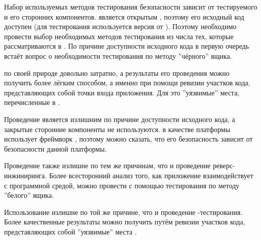 %
Набор используемых методов тестирования безопасности  зависит от  тестируемого  и его сторонних компонентов.
%
 является открытым , поэтому его исходный код доступен  (для тестирования используется версия  от ). 
%
Поэтому необходимо провести выбор необходимых методов тестирования из числа тех, которые рассматриваются в .
%
По причине доступности исходного кода в первую очередь встаёт вопрос о необходимости тестирования по методу ''чёрного'' ящика. 



%
 по своей природе довольно затратно, а результаты его проведения можно получить более лёгким способом, а именно при помощи ревизии участков кода, представляющих собой точки входа приложения.
%
Для  это ''уязвимые'' места, перечисленные в . 

%
Проведение  является излишним по причине доступности исходного кода, а закрытые сторонние компоненты не используются. 
%
 в качестве платформы использует фреймворк  , поэтому можно сказать, что его безопасность зависит от безопасности данной платформы. 

%
Проведение  также излишне по тем же причинам, что и проведение реверс-инжиниринга. 
%
Более всесторонний анализ того, как приложение взаимодействует с программной средой, можно провести с помощью тестирования по методу ''белого'' ящика. 
%

%
Использование  излишне по той же причине, что и проведение -тестирования. 
%
Более качественные результаты можно получить путём ревизии участков кода, представляющих собой ''уязвимые'' места . 

